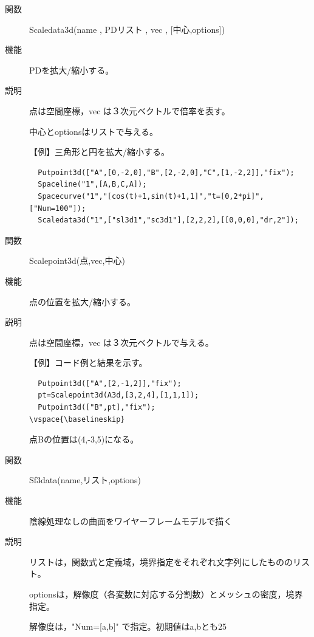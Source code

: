 \documentclass[papersize,a4paper,12pt,uplatex]{jsarticle}
\begin{document}
\begin{description}
\vspace{\baselineskip}
\hypertarget{scaledata3d}{}
\item[関数]  Scaledata3d(name , PDリスト , vec , [中心,options])
\item[機能]  PDを拡大/縮小する。
\item[説明]  点は空間座標，vec は３次元ベクトルで倍率を表す。

中心とoptionsはリストで与える。

\vspace{\baselineskip}
【例】三角形と円を拡大/縮小する。

\begin{verbatim}
  Putpoint3d(["A",[0,-2,0],"B",[2,-2,0],"C",[1,-2,2]],"fix");
  Spaceline("1",[A,B,C,A]);
  Spacecurve("1","[cos(t)+1,sin(t)+1,1]","t=[0,2*pi]",["Num=100"]);
  Scaledata3d("1",["sl3d1","sc3d1"],[2,2,2],[[0,0,0],"dr,2"]);
\end{verbatim}

\hspace{20mm}

\vspace{\baselineskip}
\hypertarget{scalepoint3d}{}
\item[関数]  Scalepoint3d(点,vec,中心)
\item[機能]  点の位置を拡大/縮小する。
\item[説明]  点は空間座標，vec は３次元ベクトルで与える。

\vspace{\baselineskip}
【例】コード例と結果を示す。

\begin{verbatim}
  Putpoint3d(["A",[2,-1,2]],"fix");
  pt=Scalepoint3d(A3d,[3,2,4],[1,1,1]); 
  Putpoint3d(["B",pt],"fix");
\vspace{\baselineskip}
\end{verbatim}

点Bの位置は(4,-3,5)になる。
\vspace{\baselineskip}
\hypertarget{sf3data}{}
\item[関数]  Sf3data(name,リスト,options)
\item[機能]  陰線処理なしの曲面をワイヤーフレームモデルで描く
\item[説明]  リストは，関数式と定義域，境界指定をそれぞれ文字列にしたもののリスト。

optionsは，解像度（各変数に対応する分割数）とメッシュの密度，境界指定。

解像度は，"Num=[a,b]" で指定。初期値はa,bとも25


\end{description}
\end{document}
